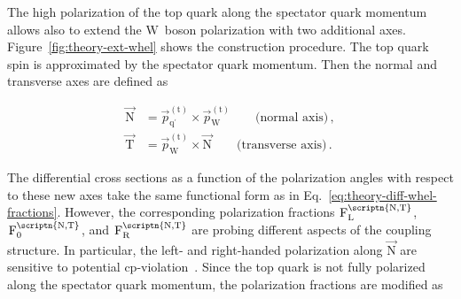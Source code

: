 The high polarization of the top quark along the spectator quark momentum allows also to extend the $\mathrm{W}$~boson polarization with two additional axes. Figure~\ref{fig:theory-ext-whel} shows the construction procedure. The top quark spin is approximated by the spectator quark momentum. Then the normal and transverse axes are defined as 

\begin{subequations}
\begin{align}
\vec{\mathrm{N}}&=\vec{p}_{\mathrm{q}^\prime}^{\mathrm{(t)}}\times\vec{p}_{\mathrm{W}}^{\mathrm{(t)}}\qquad\text{(normal axis)}\,, \\
\vec{\mathrm{T}}&=\vec{p}_{\mathrm{W}}^{\mathrm{(t)}}\times \vec{\mathrm{N}}\qquad\text{(transverse axis)}\,.
\end{align}
\end{subequations}


The differential cross sections as a function of the polarization angles with respect to these new axes take the same functional form as in Eq.~\ref{eq:theory-diff-whel-fractions}. However, the corresponding polarization fractions $\mathrm{F}_\mathrm{L}^\scriptn{\mathrm{N,T}}$, $\mathrm{F}_\mathrm{0}^\scriptn{\mathrm{N,T}}$, and $\mathrm{F}_\mathrm{R}^\scriptn{\mathrm{N,T}}$ are probing different aspects of the coupling structure. In particular, the left- and right-handed polarization along $\vec{\mathrm{N}}$ are sensitive to potential \gls{cp}-violation~\cite{AguilarSaavedra:2010nx}. Since the top quark is not fully polarized along the spectator quark momentum, the  polarization fractions are modified as

